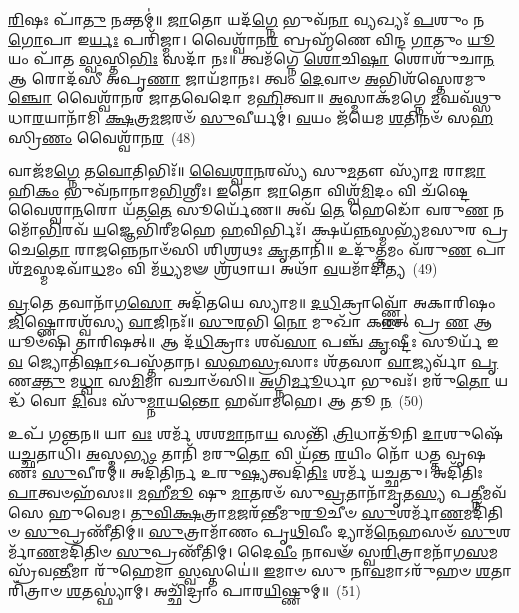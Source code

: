 \-\ul{𑌰𑌿}\-𑌷𑌃 𑌪𑌾᳴\-\ul{𑌤𑍁} 𑌨𑌕𑍍𑌤𑌮𑍍॑॥ \ul{𑌜𑌾}\-𑌤𑍋 𑌯𑌦᳴\-\ul{𑌗𑍍𑌨𑍇} 𑌭𑍁𑌵᳴\-\ul{𑌨𑌾} 𑌵𑍍𑌯𑌖𑍍𑌯𑌃᳴ \ul{𑌪}\-𑌶𑍁𑌂 𑌨 \ul{𑌗𑍋}\-𑌪𑌾 𑌇\-\ul{𑌰𑍍𑌯𑌃} 𑌪𑌰𑌿᳴𑌜𑍍𑌮𑌾। 𑌵𑍈𑌶𑍍𑌵𑌾᳴𑌨\-\ul{𑌰} 𑌬𑍍𑌰𑌹𑍍𑌮᳴𑌣𑍇 𑌵𑌿𑌨𑍍𑌦 \ul{𑌗𑌾}\-𑌤𑍁𑌂 \ul{𑌯𑍂}\-𑌯𑌂 𑌪𑌾᳴𑌤 \ul{𑌸𑍍𑌵}\-𑌸𑍍𑌤𑌿\-\ul{𑌭𑌿𑌃} 𑌸𑌦𑌾᳴ 𑌨𑌃॥ 𑌤𑍍𑌵𑌮᳴𑌗𑍍𑌨𑍇 \ul{𑌶𑍋}\-𑌚𑌿\-\ul{𑌷𑌾} 𑌶𑍋𑌶𑍁᳴𑌚𑌾\-\ul{𑌨} 𑌆 𑌰𑍋𑌦᳴𑌸𑍀 𑌅𑌪𑍃\-\ul{𑌣𑌾} 𑌜𑌾𑌯᳴𑌮𑌾𑌨𑌃। 𑌤𑍍𑌵𑌂 \ul{𑌦𑍇}\-𑌵𑌾𑍞 \ul{𑌅}\-𑌭𑌿𑌶᳴𑌸𑍍𑌤𑍇𑌰𑌮𑍁\-\ul{𑌞𑍍𑌚𑍋} 𑌵𑍈𑌶𑍍𑌵𑌾᳴𑌨𑌰 𑌜𑌾𑌤𑌵𑍇𑌦𑍋 𑌮\-\ul{𑌹𑌿}\-𑌤𑍍𑌵𑌾॥ \ul{𑌅}\-𑌸𑍍𑌮𑌾𑌕᳴𑌮𑌗𑍍𑌨𑍇 \ul{𑌮}\-𑌘𑌵᳴𑌥𑍍𑌸𑍁 𑌧𑌾\-\ul{𑌰}\-𑌯𑌾𑌨𑌾᳴𑌮𑌿 \ul{𑌕𑍍𑌷}\-𑌤𑍍𑌰\-\ul{𑌮}\-𑌜𑌰𑍞᳴ \ul{𑌸𑍁}\-𑌵𑍀𑌰𑍍𑌯𑌮𑍍॑। \ul{𑌵}\-𑌯𑌂 𑌜᳴𑌯𑍇𑌮 \ul{𑌶}\-𑌤𑌿𑌨𑍞᳴ 𑌸\-\ul{𑌹}\-𑌸𑍍𑌰𑌿\-\ul{𑌣𑌂} 𑌵𑍈𑌶𑍍𑌵𑌾᳴𑌨\-\ul{𑌰}\-~(48)

𑌵𑌾𑌜᳴𑌮\-\ul{𑌗𑍍𑌨𑍇} 𑌤\-\ul{𑌵𑍋}\-𑌤𑌿𑌭𑌿𑌃᳴॥ \ul{𑌵𑍈}\-\-\ul{𑌶𑍍𑌵𑌾}\-\-\ul{𑌨}\-𑌰𑌸𑍍𑌯᳴ 𑌸𑍁\-\ul{𑌮}\-𑌤𑍗 𑌸𑍍𑌯𑌾᳴\-\ul{𑌮} 𑌰𑌾\-\ul{𑌜𑌾} 𑌹𑌿\-\ul{𑌕𑌂} 𑌭𑍁𑌵᳴𑌨𑌾𑌨𑌾𑌮\-\ul{𑌭𑌿}\-𑌶𑍍𑌰𑍀𑌃। \ul{𑌇}\-𑌤𑍋 \ul{𑌜𑌾}\-𑌤𑍋 𑌵𑌿𑌶𑍍𑌵᳴\-\ul{𑌮𑌿}\-𑌦𑌂 𑌵𑌿 𑌚᳴𑌷𑍍𑌟𑍇 𑌵𑍈𑌶𑍍𑌵𑌾\-\ul{𑌨}\-𑌰𑍋 𑌯᳴𑌤\-\ul{𑌤𑍇} 𑌸𑍂𑌰𑍍𑌯𑍇᳴𑌣॥ 𑌅𑌵᳴ \ul{𑌤𑍇} 𑌹𑍇𑌡𑍋᳴ 𑌵𑌰𑍁\-\ul{𑌣} 𑌨𑌮𑍋᳴\-\-\ul{𑌭𑌿}\-𑌰𑌵᳴ \ul{𑌯}\-𑌜𑍍𑌞𑍇𑌭𑌿᳴𑌰𑍀𑌮𑌹𑍇 \ul{𑌹}\-𑌵𑌿𑌰𑍍𑌭𑌿𑌃᳴। 𑌕𑍍𑌷𑌯᳴\-\ul{𑌨𑍍𑌨}\-𑌸𑍍𑌮𑌭𑍍𑌯᳴𑌮𑌸𑍁𑌰 𑌪𑍍𑌰𑌚𑍇\-\ul{𑌤𑍋} 𑌰𑌾\-\ul{𑌜}\-𑌨𑍍𑌨𑍇𑌨𑌾𑍞᳴𑌸𑌿 𑌶𑌿𑌶𑍍𑌰𑌥𑌃 \ul{𑌕𑍃}\-𑌤𑌾𑌨𑌿᳴॥ 𑌉𑌦𑍁᳴\-\ul{𑌤𑍍𑌤}\-𑌮𑌂 𑌵᳴𑌰𑍁\-\ul{𑌣} 𑌪𑌾𑌶᳴\-\-\ul{𑌮}\-𑌸𑍍𑌮𑌦\-𑌵𑌾᳴\-\ul{𑌧}\-𑌮𑌂 𑌵𑌿 𑌮᳴\-\ul{𑌧𑍍𑌯}\-𑌮𑍟 𑌶𑍍𑌰᳴𑌥𑌾𑌯। 𑌅𑌥𑌾᳴ \ul{𑌵}\-𑌯𑌮𑌾᳴𑌦𑌿𑌤𑍍𑌯~(49)

\-\ul{𑌵𑍍𑌰}\-𑌤𑍇 𑌤𑌵𑌾𑌨𑌾᳴𑌗\-\ul{𑌸𑍋} 𑌅𑌦𑌿᳴𑌤𑌯𑍇 𑌸𑍍𑌯𑌾𑌮॥ \ul{𑌦}\-\-\ul{𑌧𑌿}\-𑌕𑍍𑌰𑌾𑌵𑍍𑌣𑍍𑌣𑍋᳴ 𑌅𑌕𑌾𑌰𑌿𑌷𑌂 \ul{𑌜𑌿}\-𑌷𑍍𑌣𑍋𑌰𑌶𑍍𑌵᳴𑌸𑍍𑌯 \ul{𑌵𑌾}\-𑌜𑌿𑌨𑌃᳴॥ \ul{𑌸𑍁}\-\-\ul{𑌰}\-𑌭𑌿 \ul{𑌨𑍋} 𑌮𑍁𑌖𑌾᳴ 𑌕\-\ul{𑌰}\-𑌤𑍍 𑌪𑍍𑌰 \ul{𑌣} 𑌆𑌯𑍂𑍞᳴𑌷𑌿 𑌤𑌾𑌰𑌿𑌷𑌤𑍍॥ 𑌆 𑌦᳴\-\ul{𑌧𑌿}\-𑌕𑍍𑌰𑌾𑌃 𑌶𑌵᳴\-\ul{𑌸𑌾} 𑌪𑌞𑍍𑌚᳴ \ul{𑌕𑍃}\-𑌷𑍍𑌟𑍀𑌃 𑌸𑍂𑌰𑍍𑌯᳴ 𑌇\-\ul{𑌵} 𑌜𑍍𑌯𑍋𑌤𑌿᳴\-\ul{𑌷𑌾}\-\-𑌽𑌪𑌸𑍍𑌤᳴𑌤𑌾𑌨। \ul{𑌸}\-\-\ul{𑌹}\-\-\ul{𑌸𑍍𑌰}\-𑌸𑌾𑌃 𑌶᳴\-\ul{𑌤}\-𑌸𑌾 \ul{𑌵𑌾}\-𑌜𑍍𑌯𑌰𑍍𑌵𑌾᳴ \ul{𑌪𑍃}\-𑌣\-\ul{𑌕𑍍𑌤𑍁} 𑌮\-\ul{𑌧𑍍𑌵𑌾} 𑌸\-\ul{𑌮𑌿}\-𑌮𑌾 𑌵𑌚𑌾𑍞᳴𑌸𑌿॥ \ul{𑌅}\-𑌗𑍍𑌨𑌿\-\ul{𑌰𑍍𑌮𑍂}\-𑌰𑍍𑌧𑌾 𑌭𑍁𑌵𑌃᳴। 𑌮𑌰𑍁᳴\-\ul{𑌤𑍋} 𑌯𑌦𑍍𑌧᳴ 𑌵𑍋 \ul{𑌦𑌿}\-𑌵𑌃 𑌸𑍁᳴\-\ul{𑌮𑍍𑌨𑌾}\-𑌯\-\ul{𑌨𑍍𑌤𑍋} 𑌹𑌵𑌾᳴𑌮𑌹𑍇। 𑌆 𑌤𑍂 \ul{𑌨}\-~(50)

𑌉𑌪᳴ 𑌗𑌨𑍍𑌤𑌨॥ 𑌯𑌾 \ul{𑌵𑌃} 𑌶𑌰𑍍𑌮᳴ 𑌶𑌶\-\ul{𑌮𑌾}\-𑌨𑌾\-\ul{𑌯} 𑌸𑌨𑍍𑌤𑌿᳴ \ul{𑌤𑍍𑌰𑌿}\-𑌧𑌾𑌤𑍂᳴𑌨𑌿 \ul{𑌦𑌾}\-𑌶𑍁𑌷𑍇᳴ 𑌯\-\ul{𑌚𑍍𑌛}\-𑌤𑌾𑌧𑌿᳴। \ul{𑌅}\-𑌸𑍍𑌮\-\ul{𑌭𑍍𑌯𑌂} 𑌤𑌾𑌨𑌿᳴ 𑌮𑌰𑍁\-\ul{𑌤𑍋} 𑌵𑌿 𑌯᳴𑌨𑍍𑌤 \ul{𑌰}\-𑌯𑌿𑌂 𑌨𑍋᳴ 𑌧𑌤𑍍𑌤 𑌵𑍃𑌷𑌣𑌃 \ul{𑌸𑍁}\-𑌵𑍀𑌰𑌮𑍍॑॥ 𑌅𑌦𑌿᳴𑌤𑌿𑌰𑍍𑌨 𑌉𑌰𑍁\-\ul{𑌷𑍍𑌯}\-𑌤𑍍𑌵𑌦𑌿᳴\-\ul{𑌤𑌿𑌃} 𑌶𑌰𑍍𑌮᳴ 𑌯𑌚𑍍𑌛𑌤𑍁। 𑌅𑌦𑌿᳴𑌤𑌿𑌃 \ul{𑌪𑌾}\-𑌤𑍍𑌵𑍞𑌹᳴𑌸𑌃॥ \ul{𑌮}\-𑌹𑍀\-\ul{𑌮𑍂} 𑌷𑍁 \ul{𑌮𑌾}\-𑌤𑌰𑍞᳴ 𑌸𑍁\-\ul{𑌵𑍍𑌰}\-𑌤𑌾\-𑌨𑌾᳴\-\-\ul{𑌮𑍃}\-𑌤\-\ul{𑌸𑍍𑌯} 𑌪\-\ul{𑌤𑍍𑌨𑍀}\-𑌮𑌵᳴𑌸𑍇 𑌹𑍁𑌵𑍇𑌮। \ul{𑌤𑍁}\-\-\ul{𑌵𑌿}\-\-\ul{𑌕𑍍𑌷}\-𑌤𑍍𑌰𑌾\-\-\ul{𑌮}\-𑌜𑌰᳴𑌨𑍍𑌤𑍀\-𑌮𑍁\-\ul{𑌰𑍂}\-𑌚𑍀𑍞 \ul{𑌸𑍁}\-𑌶𑌰𑍍𑌮𑌾᳴\-\ul{𑌣}\-𑌮𑌦𑌿᳴𑌤𑌿𑍞 \ul{𑌸𑍁}\-𑌪𑍍𑌰𑌣𑍀᳴𑌤𑌿𑌮𑍍॥ \ul{𑌸𑍁}\-𑌤𑍍𑌰𑌾𑌮𑌾᳴𑌣𑌂 𑌪𑍃\-\ul{𑌥𑌿}\-𑌵𑍀𑌂 𑌦𑍍𑌯𑌾𑌮᳴\-\ul{𑌨𑍇}\-𑌹𑌸𑍞᳴ \ul{𑌸𑍁}\-𑌶𑌰𑍍𑌮𑌾᳴\-\ul{𑌣}\-𑌮𑌦𑌿᳴𑌤𑌿𑍞 \ul{𑌸𑍁}\-𑌪𑍍𑌰𑌣𑍀᳴𑌤𑌿𑌮𑍍। 𑌦𑍈\-\ul{𑌵𑍀𑌂} 𑌨𑌾𑌵𑍟᳴ 𑌸𑍍𑌵\-\ul{𑌰𑌿}\-𑌤𑍍𑌰𑌾\-𑌮𑌨𑌾᳴\-𑌗\-\ul{𑌸}\-𑌮𑌸𑍍𑌰᳴𑌵\-\ul{𑌨𑍍𑌤𑍀}\-𑌮𑌾 𑌰𑍁᳴𑌹𑍇𑌮𑌾 \ul{𑌸𑍍𑌵}\-𑌸𑍍𑌤𑌯𑍇॑॥ \ul{𑌇}\-𑌮𑌾𑍞 𑌸𑍁 𑌨𑌾\-\ul{𑌵}\-𑌮𑌾\-𑌽𑌰𑍁᳴𑌹𑍞 \ul{𑌶}\-𑌤𑌾𑌰𑌿᳴𑌤𑍍𑌰𑌾𑍞 \ul{𑌶}\-𑌤𑌸𑍍𑌫𑍍𑌯𑌾॑𑌮𑍍। 𑌅𑌚𑍍𑌛𑌿᳴𑌦𑍍𑌰𑌾𑌂 𑌪𑌾𑌰\-\ul{𑌯𑌿}\-𑌷𑍍𑌣𑍁𑌮𑍍॥~(51)

{\anuvakamend[{𑌦𑌿\-\ul{𑌵𑌾} 𑌸 𑌸᳴\-\ul{𑌹}\-𑌸𑍍𑌰𑌿\-\ul{𑌣𑌂} 𑌵𑍈𑌶𑍍𑌵𑌾᳴𑌨𑌰𑌾\-𑌽\-𑌽𑌦𑌿\-\ul{𑌤𑍍𑌯} 𑌤𑍂 𑌨𑍋᳴\-𑌽\-\ul{𑌨𑍇}\-𑌹𑌸𑍞᳴ \ul{𑌸𑍁}\-𑌶𑌰𑍍𑌮𑌾᳴\-\ul{𑌣}\-𑌮𑍇\-\ul{𑌕𑌾}\-𑌨𑍍𑌨𑌵𑌿𑍞᳴\-\ul{𑌶}\-𑌤𑌿𑌶𑍍𑌚᳴}]}%
